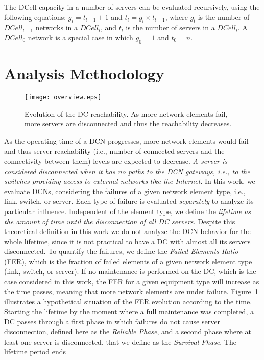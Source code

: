 The DCell capacity in a number of servers can be evaluated recursively, using the following equations: $g_l = t_{l-1} + 1$ and $t_l = g_l\times t_{l-1}$, where $g_l$ is the number of $DCell_{l-1}$ networks in a $DCell_{l}$, and $t_l$ is the number of servers in a $DCell_l$.
A $DCell_0$ network is a special case in which $g_0=1$ and $t_0=n$.

\section{Analysis Methodology}
\label{sec:methodology}
\begin{figure}
\centering
\texttt{[image: overview.eps]}
\caption{Evolution of the DC reachability. As more network elements fail, more servers are disconnected and thus the reachability decreases. }
\label{fig:overview}
\end{figure}
As the operating time of a DCN progresses, more network elements would fail and thus server reachability (i.e., number of connected servers and the connectivity between them) levels are expected to decrease. \textit{A server is considered disconnected when it has no paths to the DCN gateways, i.e., to the switches providing access to external networks like the Internet}. In this work, we evaluate DCNs, considering the failures of a given network element type, i.e., link, switch, or server. Each type of failure is evaluated \textit{separately} to analyze its particular influence. Independent of the element type, we define the \textit{lifetime as the amount of time until the disconnection of all DC servers}. 
Despite this theoretical definition in this work we do not analyze the DCN behavior for the whole lifetime, since it is not practical to have a DC with almost all its servers disconnected.
To quantify the failures, we define the \textit{Failed Elements Ratio} (FER), which is the fraction of failed elements of a given network element type (link, switch, or server). If no maintenance is performed on the DC, which is the case considered in this work, the FER for a given 
equipment type 
will increase as the time passes, meaning that more 
network elements are under failure. Figure~\ref{fig:overview} illustrates a hypothetical situation of the FER evolution according to the time. Starting the lifetime by the moment where a full maintenance was completed, a DC passes through a first phase in which failures do not cause server disconnection, defined here as the \textit{Reliable Phase}, and a second phase where at least one server is disconnected, that we define as the \textit{Survival Phase}. The lifetime period ends 
